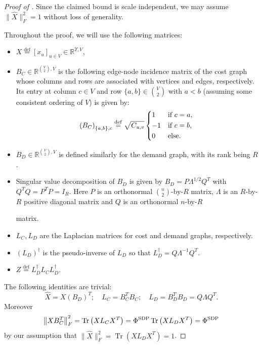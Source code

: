 \documentclass{article}
\def\triangleq{\overset{\mathrm{def}}{=}}
\newcommand{\R}{\mathbb{R}}
\DeclareMathOperator{\tr}{Tr}
\newcommand{\xvec}{\vec{x}} \newcommand{\yvec}{\vec{y}} \newcommand{\xmat}{\vec{X}} \newcommand{\ymat}{\vec{Y}} \newcommand{\zmat}{\vec{Z}}
\def\vec{}
\newcommand{\vnote}[1]{}
\newcommand{\aknote}[1]{}
\begin{document}
\begin{proof}[Proof of ]
  Since the claimed bound is scale independent, we may assume $\big\|
  \widehat{\xmat} \big\|^2_F=1$ without loss of generality.

  Throughout the proof, we will use the following matrices:
\begin{itemize}
\item $\xmat \triangleq \left[ \xvec_u \right]_{u\in V} \in \R^{\Upsilon, V}$,
\item $B_C \in \R^{\binom{V}{2}, V}$ is the following edge-node
  incidence matrix of the cost graph whose columns and rows are
  associated with vertices and edges, respectively. Its entry at
  column $c\in V$ and row $\{a,b\}\in \binom{V}{2}$ with $a<b$
  (assuming some consistent ordering of $V$) is given by:
\[
\left( B_C \right)_{\{a,b\}, c} \triangleq \sqrt{C_{u,v}}
		\begin{dcases*}
                  1 & if $c = a$, \\
                  -1 & if $c = b$, \\
                  0 & else.
		\end{dcases*}
\]
\item $B_D\in \R^{\binom{V}{2}, V}$ is defined similarly for the
  demand graph, with its rank being $R$.
\item Singular value decomposition of $B_D$ is given by $B_D = P
  \Lambda^{1/2} Q^T$ with $Q^T Q = P^T P = I_{R}$. Here $P$ is an
  orthonormal $\binom{n}{2}$-by-$R$ matrix, $\Lambda$ is an $R$-by-$R$
  positive diagonal matrix and $Q$ is an orthonormal $n$-by-$R$

  matrix. \item $L_C, L_D$ are the Laplacian matrices for cost and demand
  graphs, respectively.
\item $(L_D)^{\dagger}$ is the pseudo-inverse of $L_D$ so that
  $L_D^{\dagger} = Q \Lambda^{-1} Q^T$.
\item $Z\triangleq L_D^{\dagger} L_C L_D^{\dagger}$.
\end{itemize}
\vnote{Was the earlier argument, which argued about spectrum of $Z$ to
  capture generalized eigenvalues, wrong?}  \aknote{Nope. But I
  thought this proof is simpler.}
The following identities are trivial:
\[
\widehat{\xmat} = \xmat (B_D)^T;\quad L_C = B_C^T B_C;\quad L_D =
B_D^T B_D = Q \Lambda Q^T.\] 
Moreover
\[
\left\| \xmat B_C^T \right\|^2_F = \tr\left( \xmat L_C \xmat^T\right)
= \scsdp \tr\left( \xmat L_D \xmat^T\right) = \scsdp
\] by our assumption that $\|\widehat{\xmat}\|_F^2 = \tr\left( \xmat
  L_D \xmat^T\right)=1$.
	

\end{proof}
\end{document}
